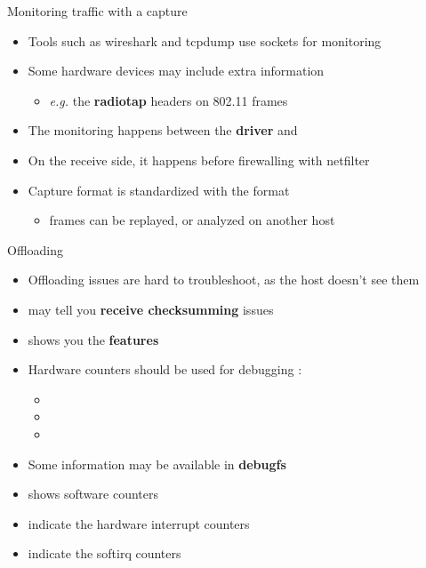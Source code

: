 \begin{frame}{Monitoring traffic with a capture}
	\begin{itemize}
		\item Tools such as wireshark and tcpdump use  sockets for monitoring 
		\item Some hardware devices may include extra information
			\begin{itemize}
				\item \textit{e.g.} the \textbf{radiotap} headers on 802.11 frames
			\end{itemize}
		\item The monitoring happens between the \textbf{driver} and 
		\item On the receive side, it happens before firewalling with netfilter
		\item Capture format is standardized with the  format
			\begin{itemize}
				\item frames can be replayed, or analyzed on another host
			\end{itemize}
	\end{itemize}
\end{frame}

\begin{frame}{Offloading}
	\begin{itemize}
		\item Offloading issues are hard to troubleshoot, as the host doesn't see them
		\item {} may tell you \textbf{receive checksumming} issues
		\item {} shows you the \textbf{features}
		\item Hardware counters should be used for debugging :
			\begin{itemize}
				\item {}
				\item {}
				\item {}
			\end{itemize}
		\item Some information may be available in \textbf{debugfs}
		\item {} shows software counters
		\item {} indicate the hardware interrupt counters
		\item {} indicate the softirq counters
	\end{itemize}
\end{frame}

